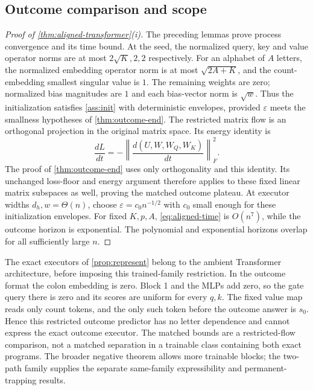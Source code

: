 \subsection{Outcome comparison and scope}
\begin{proof}[Proof of \cref{thm:aligned-transformer}(i)]
The preceding lemmas prove process convergence and its time bound.
At the seed, the normalized query, key and value operator norms are at most
$2\sqrt K,2,2$ respectively. For an alphabet of $A$ letters, the normalized
embedding operator norm is at most $\sqrt{2A+K}$, and the count-embedding
smallest singular value is $1$. The remaining weights are zero; normalized
bias magnitudes are $1$ and each bias-vector norm is $\sqrt w$.
Thus the initialization satisfies \cref{ass:init} with deterministic envelopes,
provided $\varepsilon$ meets the smallness hypotheses of \cref{thm:outcome-end}.
The restricted matrix flow is an orthogonal projection in the original matrix space.
Its energy identity is
\[
 \frac{dL}{dt}=-\left\|\frac{d(U,W,W_Q,W_K)}{dt}\right\|_F^2.
\]
The proof of \cref{thm:outcome-end} uses only orthogonality and this identity.
Its unchanged loss-floor and energy argument therefore applies to these fixed
linear matrix subspaces as well, proving the matched outcome plateau.
At executor widths $d_h,w=\Theta(n)$, choose $\varepsilon=c_0n^{-1/2}$ with
$c_0$ small enough for these initialization envelopes. For fixed $K,p,A$,
\cref{eq:aligned-time} is $O(n^7)$, while the outcome horizon is exponential.
The polynomial and exponential horizons overlap for all sufficiently large $n$.
\end{proof}

The exact executors of \cref{prop:represent} belong to the ambient Transformer
architecture, before imposing this trained-family restriction.
In the outcome format the colon embedding is zero. Block 1 and the MLPs add zero,
so the gate query there is zero and its scores are uniform for every $q,k$.
The fixed value map reads only count tokens, and the only such token before the
outcome answer is $s_0$. Hence this restricted outcome predictor has no letter
dependence and cannot express the exact outcome executor.
The matched bounds are a restricted-flow comparison, not a matched separation
in a trainable class containing both exact programs. The broader negative theorem
allows more trainable blocks; the two-path family supplies the separate same-family
expressibility and permanent-trapping results.
